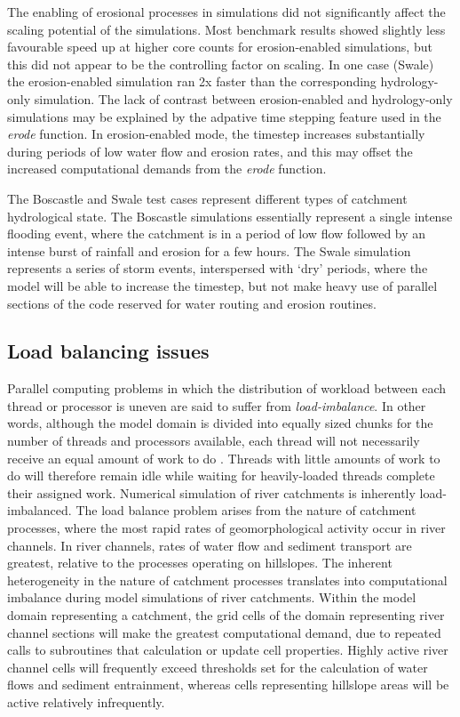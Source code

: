 The enabling of erosional processes in simulations did not significantly affect the scaling potential of the simulations. Most benchmark results showed slightly less favourable speed up at higher core counts for erosion-enabled simulations, but this did not appear to be the controlling factor on scaling. In one case (Swale) the erosion-enabled simulation ran 2x faster than the corresponding hydrology-only simulation. The lack of contrast between erosion-enabled and hydrology-only simulations may be explained by the adpative time stepping feature used in the \textit{erode} function. In erosion-enabled mode, the timestep increases substantially during periods of low water flow and erosion rates, and this may offset the increased computational demands from the \textit{erode} function.

The Boscastle and Swale test cases represent different types of catchment hydrological state. The Boscastle simulations essentially represent a single intense flooding event, where the catchment is in a period of low flow followed by an intense burst of rainfall and erosion for a few hours. The Swale simulation represents a series of storm events, interspersed with `dry' periods, where the model will be able to increase the timestep, but not make heavy use of parallel sections of the code reserved for water routing and erosion routines. 

\subsection{Load balancing issues}
\label{sec_loadbalance}
Parallel computing problems in which the distribution of workload between each thread or processor is uneven are said to suffer from \textit{load-imbalance}. In other words, although the model domain is divided into equally sized chunks for the number of threads and processors available, each thread will not necessarily receive an equal amount of work to do \citep{sakellariou1996quest}. Threads with little amounts of work to do will therefore remain idle while waiting for  heavily-loaded threads complete their assigned work. Numerical simulation of river catchments is inherently load-imbalanced. The load balance problem arises from the nature of catchment processes, where the most rapid rates of geomorphological activity occur in river channels. In river channels, rates of water flow and sediment transport are greatest, relative to the processes operating on hillslopes. The inherent heterogeneity in the nature of catchment processes translates into computational imbalance during model simulations of river catchments. Within the model domain representing a catchment, the grid cells of the domain representing river channel sections will make the greatest computational demand, due to repeated calls to subroutines that calculation or update cell properties. Highly active river channel cells will frequently exceed thresholds set for the calculation of water flows and sediment entrainment, whereas cells representing hillslope areas will be active relatively infrequently.

